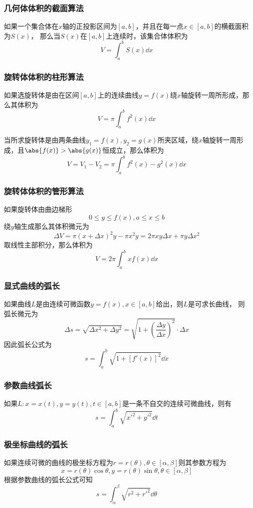 \subsubsection{几何体体积的截面算法}
如果一个集合体在$x$轴的正投影区间为$[a,b]$，并且在每一点$x\in[a,b]$的横截面积为$S(x)$，
那么当$S(x)$在$[a,b]$上连续时，该集合体体积为
\[ V = \int_a^b S(x)\dd{x} \]

\subsubsection{旋转体体积的柱形算法}
如果选旋转体是由在区间$[a,b]$上的连续曲线$y=f(x)$绕$x$轴旋转一周所形成，那么其体积为
\[ V = \pi\int_a^bf^2(x)\dd{x} \]

当所求旋转体是由两条曲线$y_1=f(x),y_2=g(x)$所夹区域，绕$x$轴旋转一周形成，且$\abs{f(x)} > \abs{g(x)}$恒成立，那么体积为
\[ V = V_1 - V_2 = \pi\int_a^b f^2(x)-g^2(x)\dd{x} \]

\subsubsection{旋转体体积的管形算法}
如果旋转体由曲边梯形
\[ 0\leq y \leq f(x), a\leq x \leq b \]
绕$y$轴生成那么其体积微元为
\[ \Delta V = \pi(x+\Delta x)^2y - \pi x^2y = 2\pi xy\Delta x + \pi y\Delta x^2  \]
取线性主部积分，那么体积为
\[ V = 2\pi\int_a^bxf(x)\dd{x} \]

\subsubsection{显式曲线的弧长}
如果曲线$L$是由连续可微函数$y=f(x),x\in[a,b]$给出，则$L$是可求长曲线，
则弧长微元为
\[ \Delta s = \sqrt{\Delta x^2 + \Delta y^2} = \sqrt{1+\left(\frac{\Delta y}{\Delta x}\right)^2}\cdot \Delta x \]
因此弧长公式为
\[ s = \int_a^b \sqrt{1+[f'(x)]^2}\dd{x} \]

\subsubsection{参数曲线弧长}如果$L: x=x(t), y=y(t),t\in[a,b]$是一条不自交的连续可微曲线，则有
\[ s = \int_a^b\sqrt{x'^2+y'^2}\dd{t} \]

\subsubsection{极坐标曲线的弧长}
如果连续可微的曲线的极坐标方程为$r=r(\theta),\theta\in[\alpha,\beta]$则其参数方程为
\[ x = r(\theta)\cos\theta,y=r(\theta)\sin\theta,\theta\in[\alpha,\beta] \]
根据参数曲线的弧长公式可知
\[ s = \int_\alpha^\beta \sqrt{r^2+r'^2}\dd{\theta} \]

